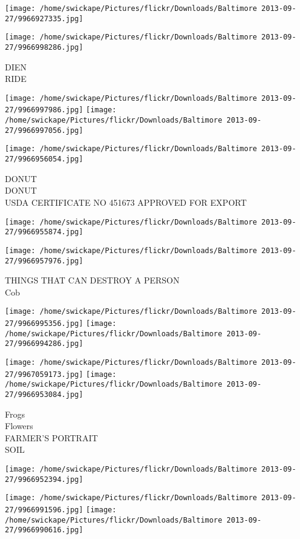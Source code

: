 \documentclass[10pt,letterpaper]{article}
\begin{document}
\texttt{[image: /home/swickape/Pictures/flickr/Downloads/Baltimore 2013-09-27/9966927335.jpg]}

\vspace{0.25in}
\texttt{[image: /home/swickape/Pictures/flickr/Downloads/Baltimore 2013-09-27/9966998286.jpg]}

DIEN\\
RIDE
\pagebreak

\texttt{[image: /home/swickape/Pictures/flickr/Downloads/Baltimore 2013-09-27/9966997986.jpg]}
\texttt{[image: /home/swickape/Pictures/flickr/Downloads/Baltimore 2013-09-27/9966997056.jpg]}

\vspace{0.25in}
\texttt{[image: /home/swickape/Pictures/flickr/Downloads/Baltimore 2013-09-27/9966956054.jpg]}

DONUT\\
DONUT\\
USDA CERTIFICATE NO 451673 APPROVED FOR EXPORT
\pagebreak

\texttt{[image: /home/swickape/Pictures/flickr/Downloads/Baltimore 2013-09-27/9966955874.jpg]}

\vspace{0.25in}
\texttt{[image: /home/swickape/Pictures/flickr/Downloads/Baltimore 2013-09-27/9966957976.jpg]}

THINGS THAT CAN DESTROY A PERSON\\
Cob
\pagebreak

\texttt{[image: /home/swickape/Pictures/flickr/Downloads/Baltimore 2013-09-27/9966995356.jpg]}
\texttt{[image: /home/swickape/Pictures/flickr/Downloads/Baltimore 2013-09-27/9966994286.jpg]}

\texttt{[image: /home/swickape/Pictures/flickr/Downloads/Baltimore 2013-09-27/9967059173.jpg]}
\texttt{[image: /home/swickape/Pictures/flickr/Downloads/Baltimore 2013-09-27/9966953084.jpg]}

Frogs\\
Flowers\\
FARMER'S PORTRAIT\\
SOIL
\pagebreak

\texttt{[image: /home/swickape/Pictures/flickr/Downloads/Baltimore 2013-09-27/9966952394.jpg]}

\vspace{0.25in}
\texttt{[image: /home/swickape/Pictures/flickr/Downloads/Baltimore 2013-09-27/9966991596.jpg]}
\texttt{[image: /home/swickape/Pictures/flickr/Downloads/Baltimore 2013-09-27/9966990616.jpg]}
\end{document}
